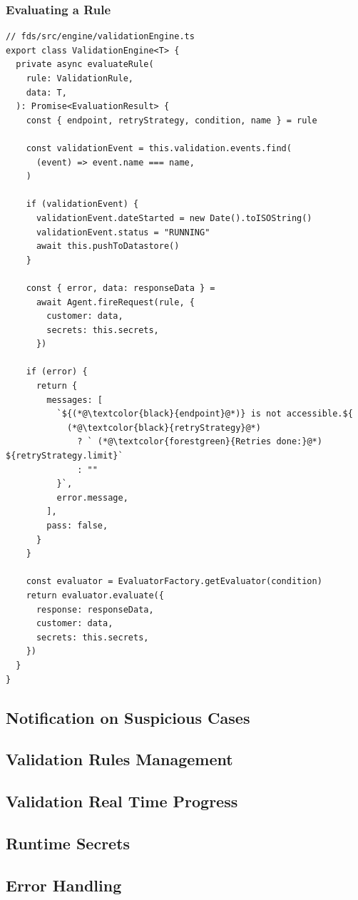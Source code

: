     \subsubsection{Evaluating a Rule} 

      \begin{lstlisting}[style=es6, caption={Rule evaluation in ValidationEngine (TypeScript)}]
// fds/src/engine/validationEngine.ts
export class ValidationEngine<T> {
  private async evaluateRule(
    rule: ValidationRule,
    data: T,
  ): Promise<EvaluationResult> {
    const { endpoint, retryStrategy, condition, name } = rule

    const validationEvent = this.validation.events.find(
      (event) => event.name === name,
    )
    
    if (validationEvent) {
      validationEvent.dateStarted = new Date().toISOString()
      validationEvent.status = "RUNNING"
      await this.pushToDatastore()
    }

    const { error, data: responseData } =
      await Agent.fireRequest(rule, {
        customer: data,
        secrets: this.secrets,
      })

    if (error) {
      return {
        messages: [
          `${(*@\textcolor{black}{endpoint}@*)} is not accessible.${
            (*@\textcolor{black}{retryStrategy}@*)
              ? ` (*@\textcolor{forestgreen}{Retries done:}@*) ${retryStrategy.limit}`
              : ""
          }`,
          error.message,
        ],
        pass: false,
      }
    }

    const evaluator = EvaluatorFactory.getEvaluator(condition)
    return evaluator.evaluate({
      response: responseData,
      customer: data,
      secrets: this.secrets,
    })
  }
}
      \end{lstlisting}
      
      

  \subsection{Notification on Suspicious Cases}

  \subsection{Validation Rules Management}

  \subsection{Validation Real Time Progress}

  \subsection{Runtime Secrets}
    \label{sub:secrets} 

  \subsection{Error Handling}

